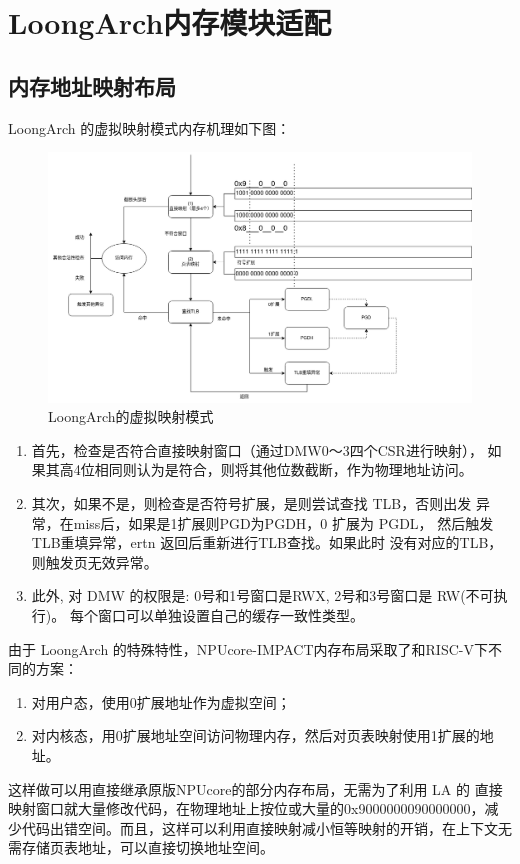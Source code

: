\section{LoongArch内存模块适配}

\subsection{内存地址映射布局}
LoongArch 的虚拟映射模式内存机理如下图：
\begin{figure}[htp]
    \centering
    \label{fig:mmu}
    \includegraphics[width=0.8\linewidth]{figs/LA虚拟内存映射.png}
    \caption{LoongArch的虚拟映射模式}
\end{figure}
\begin{enumerate}
    \item 首先，检查是否符合直接映射窗口（通过DMW0～3四个CSR进行映射），
    如果其高4位相同则认为是符合，则将其他位数截断，作为物理地址访问。
    \item 其次，如果不是，则检查是否符号扩展，是则尝试查找 TLB，否则出发
    异常，在miss后，如果是1扩展则PGD为PGDH，0 扩展为 PGDL，
    然后触发TLB重填异常，ertn 返回后重新进行TLB查找。如果此时
    没有对应的TLB，则触发页无效异常。
    \item 此外, 对 DMW 的权限是: 0号和1号窗口是RWX, 2号和3号窗口是
    RW(不可执行)。 每个窗口可以单独设置自己的缓存一致性类型。

\end{enumerate}

由于 LoongArch 的特殊特性，NPUcore-IMPACT内存布局采取了和RISC-V下不同的方案：
\begin{enumerate}
    \item 对用户态，使用0扩展地址作为虚拟空间；
    \item 对内核态，用0扩展地址空间访问物理内存，然后对页表映射使用1扩展的地址。
\end{enumerate}
这样做可以用直接继承原版NPUcore的部分内存布局，无需为了利用 LA 的
直接映射窗口就大量修改代码，在物理地址上按位或大量的0x9000000090000000，减少代码出错空间。而且，这样可以利用直接映射减小恒等映射的开销，在上下文无需存储页表地址，可以直接切换地址空间。

